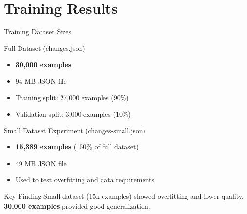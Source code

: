 \section{Training Results}
\begin{frame}{Training Dataset Sizes}
\begin{block}{Full Dataset (changes.json)}
\begin{itemize}
  \item \textbf{30,000 examples}
  \item 94 MB JSON file
  \item Training split: 27,000 examples (90\%)
  \item Validation split: 3,000 examples (10\%)
\end{itemize}
\end{block}

\begin{block}{Small Dataset Experiment (changes-small.json)}
\begin{itemize}
  \item \textbf{15,389 examples} (~50\% of full dataset)
  \item 49 MB JSON file
  \item Used to test overfitting and data requirements
\end{itemize}
\end{block}

\begin{alertblock}{Key Finding}
Small dataset (15k examples) showed overfitting and lower quality.\\
\textbf{30,000 examples} provided good generalization.
\end{alertblock}
\end{frame}

